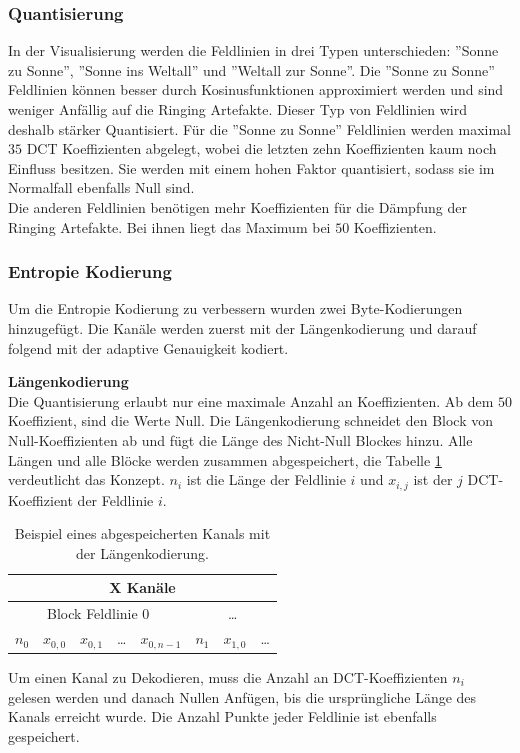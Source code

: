 \subsubsection{Quantisierung}
In der Visualisierung werden die Feldlinien in drei Typen unterschieden: ''Sonne zu Sonne'', ''Sonne ins Weltall'' und ''Weltall zur Sonne''.  Die ''Sonne zu Sonne'' Feldlinien können besser durch Kosinusfunktionen approximiert werden und sind weniger Anfällig auf die Ringing Artefakte. Dieser Typ von Feldlinien wird deshalb stärker Quantisiert. Für die ''Sonne zu Sonne'' Feldlinien werden maximal $35$ DCT Koeffizienten abgelegt, wobei die letzten zehn Koeffizienten kaum noch Einfluss besitzen. Sie werden mit einem hohen Faktor quantisiert, sodass sie im Normalfall ebenfalls Null sind.\\
Die anderen Feldlinien benötigen mehr Koeffizienten für die Dämpfung der Ringing Artefakte. Bei ihnen liegt das Maximum bei $50$ Koeffizienten.

\subsubsection{Entropie Kodierung}\label{konzept:loesung1:kodierung}
Um die Entropie Kodierung zu verbessern wurden zwei Byte-Kodierungen hinzugefügt. Die Kanäle werden zuerst mit der Längenkodierung und darauf folgend mit der adaptive Genauigkeit kodiert.

\textbf{Längenkodierung}\\
Die Quantisierung erlaubt nur eine maximale Anzahl an Koeffizienten. Ab dem $50$ Koeffizient, sind die Werte Null. Die Längenkodierung schneidet den Block von Null-Koeffizienten ab und fügt die Länge des Nicht-Null Blockes hinzu. Alle Längen und alle Blöcke werden zusammen abgespeichert, die Tabelle \ref{konzept:loesung1:entropie:laengenkodierung} verdeutlicht das Konzept. $n_i$ ist die Länge der Feldlinie $i$ und $x_{i,j}$ ist der $j$ DCT-Koeffizient der Feldlinie $i$.\\
\begin{table}[!htbp]
	\center
	\begin{tabular}{||c|c|c|c|c||c|c|c}
		\hline
		\multicolumn{8}{|c|}{X Kanäle}\\\hline\hline
		 \multicolumn{5}{||c||}{Block Feldlinie 0} & \multicolumn{3}{c}{\ldots} \\\hline
		$n_0$ &$x_{0,0}$ &$x_{0,1}$ & \ldots & $x_{0,n-1}$ & $n_1$ & $x_{1,0}$ & \ldots\\\hline
	\end{tabular}
	\caption{Beispiel eines abgespeicherten Kanals mit der Längenkodierung.}
	\label{konzept:loesung1:entropie:laengenkodierung}
\end{table}
Um einen Kanal zu Dekodieren, muss die Anzahl an DCT-Koeffizienten $n_i$ gelesen werden und danach Nullen Anfügen, bis die ursprüngliche Länge des Kanals erreicht wurde. Die Anzahl Punkte jeder Feldlinie ist ebenfalls gespeichert.

